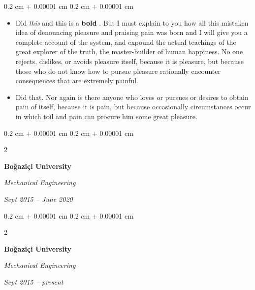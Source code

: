 \documentclass[10pt, letterpaper]{article}
\newenvironment{highlights}{
    \begin{itemize}[
        topsep=0.10 cm,
        parsep=0.10 cm,
        partopsep=0pt,
        itemsep=0pt,
        leftmargin=0.4 cm + 10pt
    ]
}{
    \end{itemize}
} %
\newenvironment{onecolentry}{
    \begin{adjustwidth}{
        0.2 cm + 0.00001 cm
    }{
        0.2 cm + 0.00001 cm
    }
}{
    \end{adjustwidth}
} %
\newenvironment{twocolentry}[2][]{
    \onecolentry
    \def\secondColumn{#2}
    \setcolumnwidth{\fill, 4.5 cm}
    \begin{paracol}{2}
}{
    \switchcolumn \raggedleft \secondColumn
    \end{paracol}
    \endonecolentry
} %
\let\hrefWithoutArrow\href
\renewcommand{\href}[2]{\hrefWithoutArrow{#1}{\ifthenelse{\equal{#2}{}}{ }{#2 }\raisebox{.15ex}{\footnotesize \faExternalLink*}}}
\begin{document}
        \vspace{0.10 cm}
        \begin{onecolentry}
            \begin{highlights}
                \item Did \textit{this} and this is a \textbf{bold} \href{https://example.com}{link}. But I must explain to you how all this mistaken idea of denouncing pleasure and praising pain was born and I will give you a complete account of the system, and expound the actual teachings of the great explorer of the truth, the master-builder of human happiness. No one rejects, dislikes, or avoids pleasure itself, because it is pleasure, but because those who do not know how to pursue pleasure rationally encounter consequences that are extremely painful.
                \item Did that. Nor again is there anyone who loves or pursues or desires to obtain pain of itself, because it is pain, but because occasionally circumstances occur in which toil and pain can procure him some great pleasure.
            \end{highlights}
        \end{onecolentry}


        \vspace{0.2 cm}

        \begin{twocolentry}{
            
            
        \textit{Sept 2015 – June 2020}}
            \textbf{Boğaziçi University}

            \textit{Mechanical Engineering}
        \end{twocolentry}



        \vspace{0.2 cm}

        \begin{twocolentry}{
            
            
        \textit{Sept 2015 – present}}
            \textbf{Boğaziçi University}

            \textit{Mechanical Engineering}
        \end{twocolentry}
\end{document}
